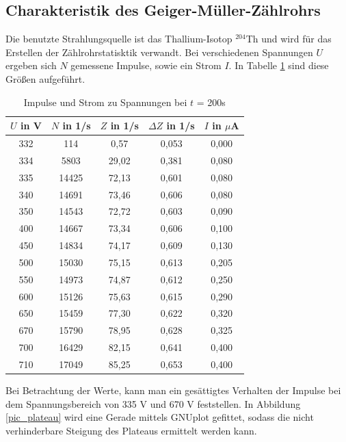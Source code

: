 \subsection{Charakteristik des Geiger-Müller-Zählrohrs}
Die benutzte Strahlungsquelle ist das Thallium-Isotop $^{204}$Th und wird für das Erstellen der Zählrohrstatisktik verwandt. Bei
verschiedenen Spannungen $U$ ergeben sich $N$ gemessene Impulse, sowie ein Strom $I$. In Tabelle \ref{tab_charakteristik} sind diese
Größen aufgeführt.

\begin{table}[H]
 \begin{tabular}{c|c|c|c|c}
 $U$ in V & $N$ in 1/s & $Z$ in 1/s & $\Delta Z$ in 1/s & $I$ in $\mu$A \\
 \hline
  332&	114 &0,57&	0,053&	0,000 \\
334&	5803 &29,02&	0,381&	0,080\\
335&	14425&	72,13&	0,601&	0,080\\
340&	14691&	73,46&	0,606&	0,080\\
350&	14543&	72,72&	0,603&	0,090\\
400&	14667&	73,34&	0,606&	0,100\\
450&	14834&	74,17&	0,609&	0,130\\
500&	15030&	75,15&	0,613&	0,205\\
550&	14973&	74,87&	0,612&	0,250\\
600&	15126&	75,63&	0,615&	0,290\\
650&	15459&	77,30&	0,622&	0,320\\
670&	15790&	78,95&	0,628&	0,325\\
700&	16429&	82,15&	0,641&	0,400\\
710&	17049&	85,25&	0,653 &	0,400\\
 \end{tabular}
\caption{Impulse und Strom zu Spannungen bei $t$ = 200s}
\label{tab_charakteristik}
 \end{table}

Bei Betrachtung der Werte, kann man ein gesättigtes Verhalten der Impulse bei dem Spannungsbereich von 335 V und 670 V feststellen. In
Abbildung \ref{pic_plateau} wird eine Gerade mittels GNUplot gefittet, sodass die nicht verhinderbare Steigung des Plateaus ermittelt
werden kann.

